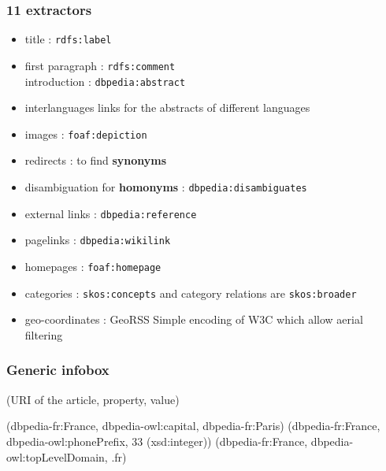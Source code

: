 \documentclass{beamer}
\begin{document}
\begin{frame}[fragile]
	\frametitle{11 extractors}

	\begin{itemize}
	\item title : \texttt{rdfs:label}
	\item first paragraph : \texttt{rdfs:comment}  \\ introduction : \texttt{dbpedia:abstract}
	\item interlanguages links for the abstracts of different languages
	\item images : \texttt{foaf:depiction}
	\item redirects : to find \textbf{synonyms}
	\item disambiguation for \textbf{homonyms} : \texttt{dbpedia:disambiguates}
	\item external links : \texttt{dbpedia:reference}
	\item pagelinks : \texttt{dbpedia:wikilink}
	\item homepages : \texttt{foaf:homepage}
	\item categories : \texttt{skos:concepts} and category relations are \texttt{skos:broader}
	\item geo-coordinates : GeoRSS Simple encoding of W3C which allow aerial filtering
	\end{itemize}
\end{frame}

\begin{frame}[fragile]
	\frametitle{Generic infobox}
	\begin{block}{}
	(URI of the article, property, value)
	\end{block}

	\begin{block}{}
	(dbpedia-fr:France, dbpedia-owl:capital, dbpedia-fr:Paris)
	(dbpedia-fr:France, dbpedia-owl:phonePrefix, 33 (xsd:integer))
	(dbpedia-fr:France, dbpedia-owl:topLevelDomain, .fr)
	\end{block}
\end{frame}
\end{document}
